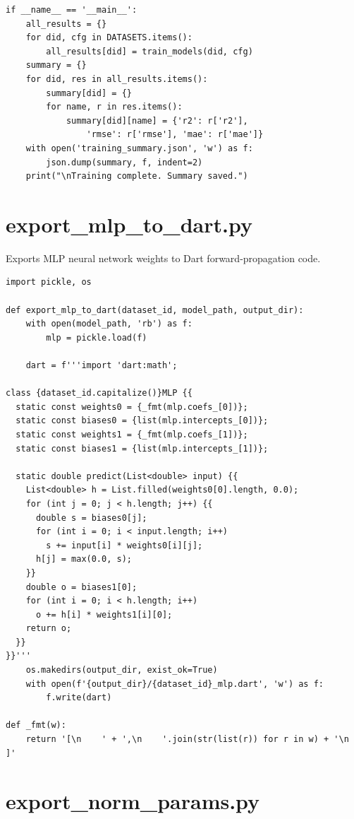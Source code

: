 \documentclass[12pt,a4paper,oneside]{report}
\begin{document}
\begin{lstlisting}[style=pythonstyle]
if __name__ == '__main__':
    all_results = {}
    for did, cfg in DATASETS.items():
        all_results[did] = train_models(did, cfg)
    summary = {}
    for did, res in all_results.items():
        summary[did] = {}
        for name, r in res.items():
            summary[did][name] = {'r2': r['r2'],
                'rmse': r['rmse'], 'mae': r['mae']}
    with open('training_summary.json', 'w') as f:
        json.dump(summary, f, indent=2)
    print("\nTraining complete. Summary saved.")
\end{lstlisting}

\section{export\_mlp\_to\_dart.py}

Exports MLP neural network weights to Dart forward-propagation code.

\begin{lstlisting}[style=pythonstyle]
import pickle, os

def export_mlp_to_dart(dataset_id, model_path, output_dir):
    with open(model_path, 'rb') as f:
        mlp = pickle.load(f)

    dart = f'''import 'dart:math';

class {dataset_id.capitalize()}MLP {{
  static const weights0 = {_fmt(mlp.coefs_[0])};
  static const biases0 = {list(mlp.intercepts_[0])};
  static const weights1 = {_fmt(mlp.coefs_[1])};
  static const biases1 = {list(mlp.intercepts_[1])};

  static double predict(List<double> input) {{
    List<double> h = List.filled(weights0[0].length, 0.0);
    for (int j = 0; j < h.length; j++) {{
      double s = biases0[j];
      for (int i = 0; i < input.length; i++)
        s += input[i] * weights0[i][j];
      h[j] = max(0.0, s);
    }}
    double o = biases1[0];
    for (int i = 0; i < h.length; i++)
      o += h[i] * weights1[i][0];
    return o;
  }}
}}'''
    os.makedirs(output_dir, exist_ok=True)
    with open(f'{output_dir}/{dataset_id}_mlp.dart', 'w') as f:
        f.write(dart)

def _fmt(w):
    return '[\n    ' + ',\n    '.join(str(list(r)) for r in w) + '\n  ]'
\end{lstlisting}

\section{export\_norm\_params.py}
\end{document}
